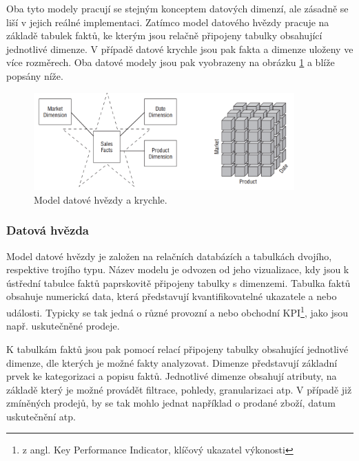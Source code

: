 \documentclass[
  digital,     %
  twoside,     %
  lof,         %
  lot,         %
]{fithesis4}
\begin{document}
Oba tyto modely pracují se stejným konceptem datových dimenzí, ale zásadně se liší v jejich reálné implementaci. Zatímco model datového hvězdy pracuje na základě  tabulek faktů, ke kterým jsou relačně připojeny tabulky obsahující jednotlivé dimenze. V případě datové krychle jsou pak fakta a dimenze uloženy ve více rozměrech.\parencite[s.9]{Kimball2013} Oba datové modely jsou pak vyobrazeny na obrázku \ref{fig:star_olap} a blíže popsány níže. 
\begin{figure}[h]
  \begin{center}
          \includegraphics[width=10cm]{img/star_olap.png}
  \end{center}
  \caption{Model datové hvězdy a krychle.  \parencite[s.9]{Kimball2013}}
  \label{fig:star_olap}
\end{figure}  

\subsubsection{Datová hvězda}
Model datové hvězdy je založen na relačních databázích a tabulkách dvojího, respektive trojího typu. Název modelu je odvozen od jeho vizualizace, kdy jsou k ústřední tabulce faktů paprskovitě připojeny tabulky s dimenzemi. Tabulka faktů obsahuje numerická data, která představují kvantifikovatelné ukazatele a nebo události.\parencite[s.10]{Kimball2013} Typicky se tak jedná o různé provozní a nebo obchodní KPI\footnote{z angl. Key Performance Indicator, klíčový ukazatel výkonosti}, jako jsou např. uskutečněné prodeje.

K tabulkám faktů jsou pak pomocí relací připojeny tabulky obsahující jednotlivé dimenze, dle kterých je možné fakty analyzovat. Dimenze představují základní prvek ke kategorizaci a popisu faktů. Jednotlivé dimenze obsahují atributy, na základě který je možné provádět filtrace, pohledy, granularizaci atp. V případě již zmíněných prodejů, by se tak mohlo jednat například o prodané zboží, datum uskutečnění atp.
\end{document}
